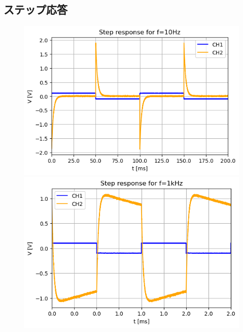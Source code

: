 \documentclass[a4paper]{ltjsarticle}
\begin{document}
\subsection{ステップ応答}
\begin{figure}[htbp]
    \centering
    \begin{minipage}{0.48\columnwidth}
        \centering
        \includegraphics[width=0.95\columnwidth]{./images/dervamp_10Hz.png}
    \end{minipage}
    \begin{minipage}{0.48\columnwidth}
        \centering
        \includegraphics[width=0.95\columnwidth]{./images/dervamp_1kHz.png}
    \end{minipage} \\
    \begin{minipage}{0.48\columnwidth}

\end{minipage}
\end{figure}
\end{document}
